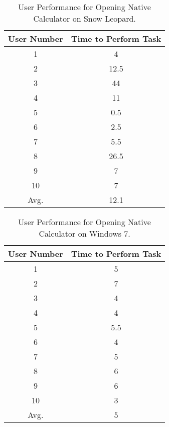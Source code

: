 \documentclass[11pt,letterpaper]{report}
\begin{document}
\begin{table}
    \centering
    \begin{tabular}{| c | c |}
        \hline
        User Number & Time to Perform Task \\ \hline
        1 & 4 \\  \hline
        2 & 12.5 \\  \hline
        3 & 44 \\ \hline
        4 & 11 \\  \hline
        5 & 0.5 \\    \hline
        6 & 2.5 \\  \hline
        7 & 5.5 \\ \hline
        8 & 26.5 \\  \hline
        9 & 7 \\ \hline
        10 & 7 \\ \hline
        Avg. & 12.1 \\
        \hline
    \end{tabular}
    \caption{User Performance for Opening Native Calculator on Snow Leopard.}
    \label{calcM}    
\end{table}

\begin{table}
    \centering
    \begin{tabular}{| c | c |}
        \hline
        User Number & Time to Perform Task \\ \hline
        1 & 5 \\  \hline
        2 & 7 \\  \hline
        3 & 4 \\ \hline
        4 & 4 \\  \hline
        5 & 5.5 \\    \hline
        6 & 4 \\  \hline
        7 & 5 \\ \hline
        8 & 6 \\  \hline
        9 & 6 \\ \hline
        10 & 3 \\ \hline
        Avg. & 5 \\
        \hline
    \end{tabular}
    \caption{User Performance for Opening Native Calculator on Windows 7.}
    \label{calcW}    
\end{table}
\end{document}
